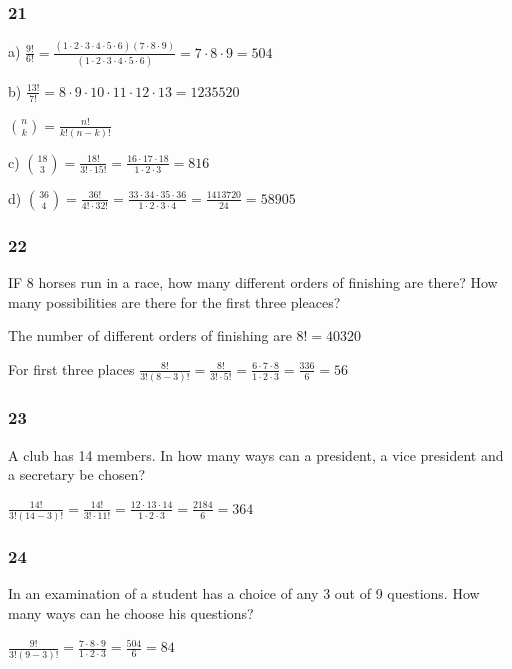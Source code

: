 \documentclass[]{report}
\begin{document}
\subsubsection{21}

a) $\frac{9!}{6!} = \frac{(1 \cdot 2 \cdot 3 \cdot 4 \cdot 5 \cdot 6) (7 \cdot 8 \cdot 9)}{(1 \cdot 2 \cdot 3 \cdot 4 \cdot 5 \cdot 6)} = 7 \cdot 8 \cdot 9 = 504$

b) $\frac{13!}{7!} = 8 \cdot 9 \cdot 10 \cdot 11 \cdot 12 \cdot 13 = 1235520$

${n \choose k} = \frac{n!}{k!(n-k)!}$

c) ${18 \choose 3} = \frac{18!}{3! \cdot 15!} = \frac{16 \cdot 17 \cdot 18}{1 \cdot 2 \cdot 3} = 816$

d) ${36 \choose 4} = \frac{36!}{4!\cdot 32!} = \frac{33 \cdot 34 \cdot 35 \cdot 36}{1 \cdot 2 \cdot 3 \cdot 4} = \frac{1413720}{24}= 58905$

\subsubsection{22}

IF 8 horses run in a race, how many different orders of finishing are there? How many possibilities are there for the first three pleaces?

The number of different orders of finishing are $8! = 40320$

For first three places $\frac{8!}{3!(8-3)!} = \frac{8!}{3! \cdot 5!} = \frac{6 \cdot 7 \cdot 8}{1 \cdot 2 \cdot 3} = \frac{336}{6} = 56$

\subsubsection{23}

A club has 14 members. In how many ways can a president, a vice president and a secretary be chosen?

$\frac{14!}{3!(14-3)!} = \frac{14!}{3! \cdot 11!} = \frac{12 \cdot 13 \cdot 14}{1 \cdot 2 \cdot 3} = \frac{2184}{6} = 364$

\subsubsection{24}

In an examination of a student has a choice of any 3 out of 9 questions. How many ways can he choose his questions?

$\frac{9!}{3!(9 - 3)!} = \frac{7 \cdot 8 \cdot 9}{1 \cdot 2 \cdot 3} = \frac{504}{6} = 84$
\end{document}
